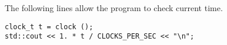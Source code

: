 The following lines allow the program to check current time.

\begin{verbatim}
clock_t t = clock ();
std::cout << 1. * t / CLOCKS_PER_SEC << "\n";
\end{verbatim}

